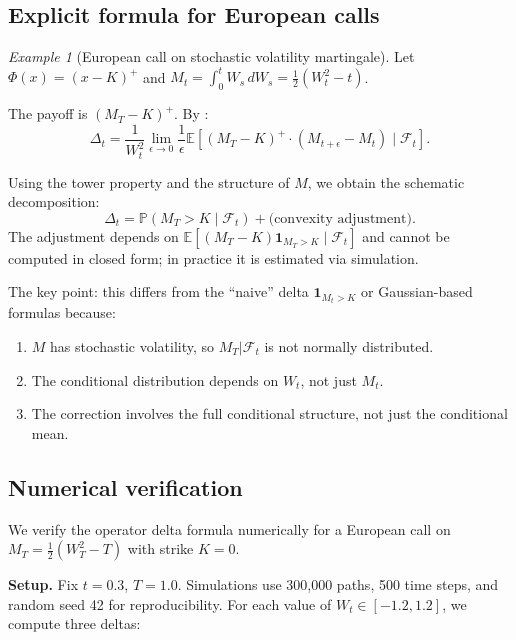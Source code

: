 \documentclass[11pt]{article}
\theoremstyle{plain}
\theoremstyle{definition}
\theoremstyle{remark}
\newtheorem{example}{Example}[section]
\newcommand{\E}{\mathbb{E}}
\newcommand{\F}{\mathcal{F}}
\begin{document}
\subsection{Explicit formula for European calls}

\begin{example}[European call on stochastic volatility martingale]\label{ex:call}
Let $\Phi(x) = (x - K)^+$ and $M_t = \int_0^t W_s\,dW_s = \frac{1}{2}(W_t^2 - t)$.

The payoff is $(M_T - K)^+$. By :
\begin{equation}\label{eq:call-delta}
\Delta_t = \frac{1}{W_t^2} \lim_{\epsilon \to 0} \frac{1}{\epsilon}
\E[(M_T - K)^+ \cdot (M_{t+\epsilon} - M_t) \mid \F_t].
\end{equation}

Using the tower property and the structure of $M$, we obtain the schematic 
decomposition:
\begin{equation}\label{eq:call-delta-explicit}
\Delta_t = \mathbb{P}(M_T > K \mid \F_t) + \text{(convexity adjustment)}.
\end{equation}
The adjustment depends on $\E[(M_T - K) \mathbf{1}_{M_T > K} \mid \F_t]$ and 
cannot be computed in closed form; in practice it is estimated via simulation.

The key point: this differs from the ``naive'' delta $\mathbf{1}_{M_t > K}$ or 
Gaussian-based formulas because:
\begin{enumerate}[label=(\alph*)]
\item $M$ has stochastic volatility, so $M_T | \F_t$ is not normally distributed.
\item The conditional distribution depends on $W_t$, not just $M_t$.
\item The correction involves the full conditional structure, not just the 
conditional mean.
\end{enumerate}
\end{example}

\subsection{Numerical verification}\label{sec:numerical}

We verify the operator delta formula numerically for a European call on 
$M_T = \frac{1}{2}(W_T^2 - T)$ with strike $K = 0$.

\textbf{Setup.} Fix $t = 0.3$, $T = 1.0$. Simulations use 300,000 paths, 500 time 
steps, and random seed 42 for reproducibility. For each value of $W_t \in [-1.2, 1.2]$, 
we compute three deltas:
\end{document}
